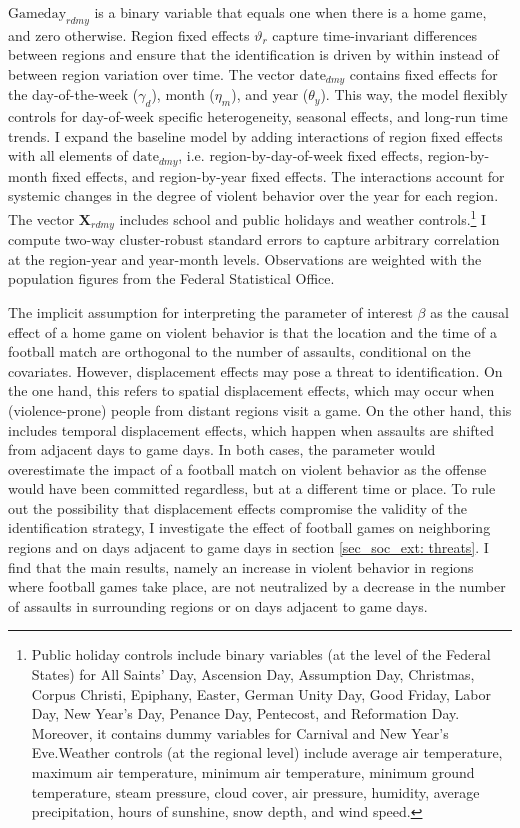 $\text{Gameday}_{rdmy}$ is a binary variable that equals one when there is a home game, and zero otherwise. Region fixed effects $\vartheta_r$ capture time-invariant differences between regions and ensure that the identification is driven by within instead of between region variation over time. The vector $\text{date}_{dmy}$ contains fixed effects for the day-of-the-week ($\gamma_d$), month ($\eta_m$), and year ($\theta_y$). This way, the model flexibly controls for day-of-week specific heterogeneity, seasonal effects, and long-run time trends. I expand the baseline model by adding interactions of region fixed effects with all elements of $\text{date}_{dmy}$, i.e. region-by-day-of-week fixed effects, region-by-month fixed effects, and region-by-year fixed effects. The interactions account for systemic changes in the degree of violent behavior over the year for each region. The vector $\mathbf{X}_{rdmy}$ includes school and public holidays and weather controls.\footnote{Public holiday controls include binary variables (at the level of the Federal States) for All Saints' Day, Ascension Day, Assumption Day, Christmas, Corpus Christi, Epiphany, Easter, German Unity Day, Good Friday, Labor Day, New Year's Day, Penance Day, Pentecost, and Reformation Day. Moreover, it contains dummy variables for Carnival and New Year's Eve.\newline Weather controls (at the regional level) include average air temperature, maximum air temperature, minimum air temperature, minimum ground temperature, steam pressure, cloud cover, air pressure, humidity, average precipitation, hours of sunshine, snow depth, and wind speed.} I compute two-way cluster-robust standard errors to capture arbitrary correlation at the region-year and year-month levels. Observations are weighted with the population figures from the Federal Statistical Office.


The implicit assumption for interpreting the parameter of interest $\beta$ as the causal effect of a home game on violent behavior is that the location and the time of a football match are orthogonal to the number of assaults, conditional on the covariates. However, displacement effects may pose a threat to identification. On the one hand, this refers to spatial displacement effects, which may occur when (violence-prone) people from distant regions visit a game. On the other hand, this includes temporal displacement effects, which happen when assaults are shifted from adjacent days to game days. In both cases, the parameter would overestimate the impact of a football match on violent behavior as the offense would have been committed regardless, but at a different time or place. To rule out the possibility that displacement effects compromise the validity of the identification strategy, I investigate the effect of football games on neighboring regions and on days adjacent to game days in section \ref{sec_soc_ext: threats}. I find that the main results, namely an increase in violent behavior in regions where football games take place, are not neutralized by a decrease in the number of assaults in surrounding regions or on days adjacent to game days.


